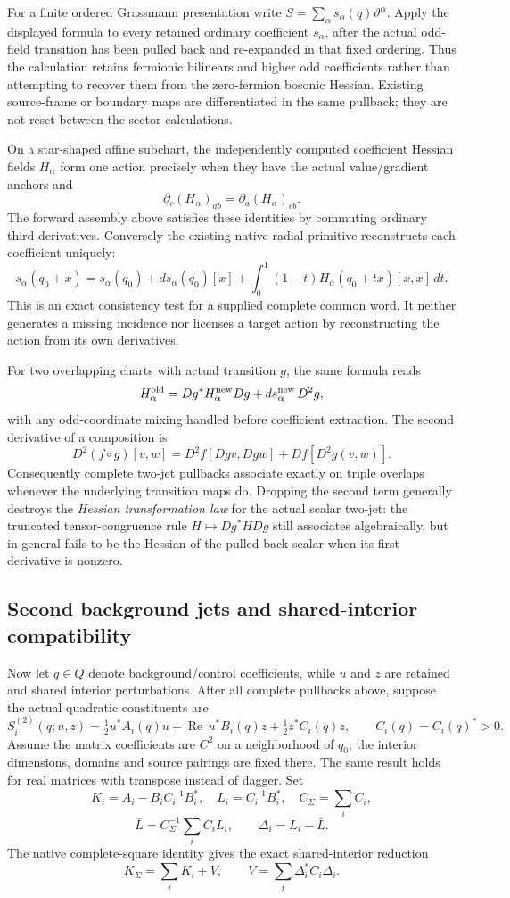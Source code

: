 \documentclass[12pt,a4paper]{article}
\begin{document}
For a finite ordered Grassmann presentation write
$S=\sum_\alpha s_\alpha(q)\vartheta^\alpha$.  Apply the displayed
formula to every retained ordinary coefficient $s_\alpha$, after the
actual odd-field transition has been pulled back and re-expanded in that
fixed ordering.  Thus the calculation retains fermionic bilinears and
higher odd coefficients rather than attempting to recover them from
the zero-fermion bosonic Hessian.  Existing source-frame or boundary
maps are differentiated in the same pullback; they are not reset between
the sector calculations.

On a star-shaped affine subchart, the independently computed coefficient
Hessian fields $H_\alpha$ form one action precisely when they have the
actual value/gradient anchors and
\[
 \partial_c(H_\alpha)_{ab}=\partial_a(H_\alpha)_{cb}.
\]
The forward assembly above satisfies these identities by commuting
ordinary third derivatives.  Conversely the existing native radial
primitive reconstructs each coefficient uniquely:
\[
 s_\alpha(q_0+x)=s_\alpha(q_0)+ds_\alpha(q_0)[x]
    +\int_0^1(1-t)H_\alpha(q_0+tx)[x,x]\,dt.
\]
This is an exact consistency test for a supplied complete common word.
It neither generates a missing incidence nor licenses a target action
by reconstructing the action from its own derivatives.

For two overlapping charts with actual transition $g$, the same
formula reads
\[
 H_\alpha^{\rm old}=Dg^*H_\alpha^{\rm new}Dg
                  +ds_\alpha^{\rm new}\,D^2g,
\]
with any odd-coordinate mixing handled before coefficient extraction.
The second derivative of a composition is
\[
 D^2(f\circ g)[v,w]
 =D^2f[Dg v,Dg w]+Df[D^2g(v,w)].
\]
Consequently complete two-jet pullbacks associate exactly on triple
overlaps whenever the underlying transition maps do.  Dropping the
second term generally destroys the \emph{Hessian transformation law}
for the actual scalar two-jet: the truncated tensor-congruence rule
\(H\mapsto Dg^*HDg\) still associates algebraically, but in general
fails to be the Hessian of the pulled-back scalar when its first
derivative is nonzero.

\subsection{Second background jets and shared-interior compatibility}
Now let $q\in Q$ denote background/control coefficients, while $u$ and
$z$ are retained and shared interior perturbations.  After all complete
pullbacks above, suppose the actual quadratic constituents are
\[
 S_i^{(2)}(q;u,z)=\tfrac12 u^*A_i(q)u
       +\operatorname{Re}\,u^*B_i(q)z+\tfrac12z^*C_i(q)z,
 \qquad C_i(q)=C_i(q)^*>0.
\]
Assume the matrix coefficients are $C^2$ on a neighborhood of $q_0$;
the interior dimensions, domains and source pairings are fixed there.
The same result holds for real matrices with transpose instead of dagger.
Set
\[
 K_i=A_i-B_iC_i^{-1}B_i^*,\quad L_i=C_i^{-1}B_i^*,\quad
 C_\Sigma=\sum_iC_i,
\]
\[
 \bar L=C_\Sigma^{-1}\sum_iC_iL_i,\qquad
 \Delta_i=L_i-\bar L.
\]
The native complete-square identity gives the exact shared-interior
reduction
\[
 K_\Sigma=\sum_iK_i+V,\qquad
 V=\sum_i\Delta_i^*C_i\Delta_i.
\]
\end{document}
